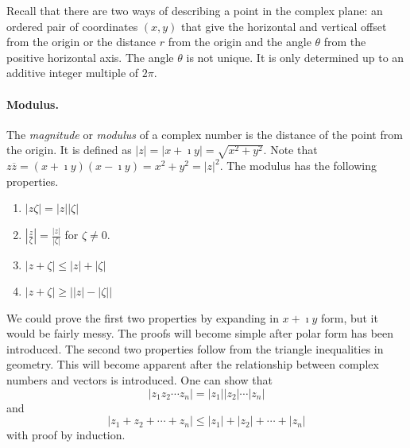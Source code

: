 Recall that there are two ways of describing a point in the complex plane: an
ordered pair of coordinates $(x, y)$ that give the horizontal and
vertical offset from the origin or the distance $r$ from the origin
and the angle $\theta$ from the positive horizontal axis.  The angle $\theta$
is not unique.  It is only determined up to an additive integer
multiple of $2 \pi$.




\paragraph{Modulus.}
The \textit{magnitude} or \textit{modulus} of a complex number is the 
distance of the point from the origin.  It is defined 
as $|z| = |x + \imath y| = \sqrt{x^2 + y^2}$.  Note that 
$z \overline{z} = (x + \imath y)(x - \imath y) = x^2 + y^2 = |z|^2$.
The modulus has the following properties.
\begin{enumerate}
\item
  $\displaystyle \left|z \zeta \right| = \left|z \right| \left|\zeta \right|$
\item
  $\displaystyle \left| \frac{z}{\zeta} \right| = \frac{ \left|z \right|}
  { \left|\zeta \right|}$ for $\zeta \neq 0$.
\item
  $\displaystyle \left|z + \zeta \right| \leq \left|z \right| + \left|\zeta \right|$
\item
  $\displaystyle \left|z + \zeta \right| 
  \geq \left|\left|z \right| - \left|\zeta \right| \right|$
\end{enumerate}
We could prove the first two properties by expanding in $x + \imath y$ form, 
but it would be fairly messy.  The proofs will become simple after polar 
form has been introduced.  The second two properties
follow from the triangle inequalities in geometry.  This will become apparent
after the relationship between complex numbers and vectors is introduced.
One can show that
\[
\left|z_1 z_2 \cdots z_n \right| 
= \left|z_1 \right| \left|z_2 \right| \cdots \left|z_n \right|
\]
and
\[
\left|z_1 + z_2 + \cdots + z_n \right| 
\leq \left|z_1 \right| + \left|z_2 \right| + \cdots + \left|z_n \right|
\]
with proof by induction.




